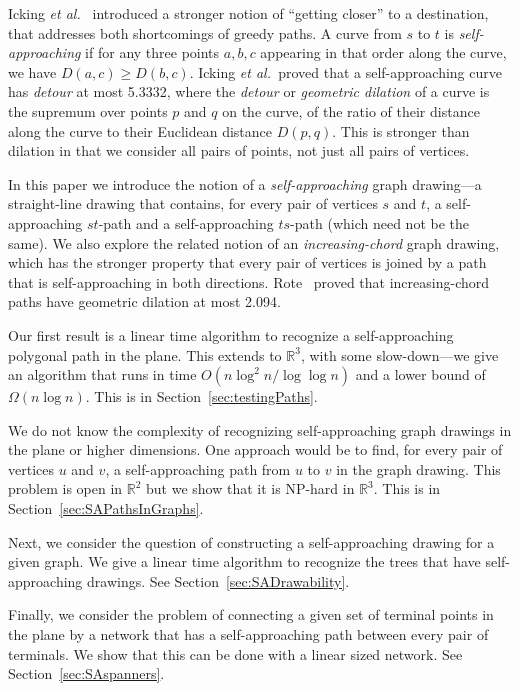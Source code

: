 \documentclass[11pt]{article}
\newcommand{\etal}{{\em et al.~}}
\begin{document}
Icking \etal\cite{Icking:self-approachingcurves:1995} introduced a stronger notion of
 ``getting closer'' to a destination, that addresses both shortcomings of greedy paths.
A curve from $s$ to $t$ is \emph{self-approaching} if for any three points $a, b, c$ appearing in that order along the curve, we have $D(a,c) \ge D(b,c)$.
Icking \etal proved that a self-approaching curve has \emph{detour} at most 5.3332, where the \emph{detour} or \emph{geometric dilation} of a curve is the supremum over points $p$ and $q$ on the curve, of the ratio of their distance along the curve to their Euclidean distance $D(p,q)$.
This is stronger than dilation in that we consider all pairs of points, not just all pairs of vertices.

In this paper we introduce the notion of a \emph{self-approaching} graph drawing---a straight-line drawing  that contains, for every pair of vertices $s$ and $t$,
a self-approaching $st$-path and a self-approaching $ts$-path (which need not be the same).
We also explore the related notion of an \emph{increasing-chord} graph drawing, which has the stronger property that every pair of vertices is joined by a path that is self-approaching in both directions.
Rote~\cite{Rote:ICcurves:1994} proved that increasing-chord paths have geometric dilation  at most 2.094.

Our first result is a linear time algorithm to recognize a self-approaching polygonal path in the plane.
This extends to $\mathbb{R}^3$, with some slow-down---we give an algorithm that runs in time $O(n \log^2 n / \log \log n)$ and a lower bound of $\Omega(n \log n)$.  This is in Section~\ref{sec:testingPaths}.

We do not know the complexity of recognizing self-approaching graph drawings in the plane or higher dimensions.
One approach would be to find, for every pair of vertices $u$ and $v$, a self-approaching path from $u$ to $v$ in the graph drawing.   This problem is open in $\mathbb{R}^2$ but we show that it  is NP-hard in $\mathbb{R}^3$.  This is in Section~\ref{sec:SAPathsInGraphs}.


Next, we consider the question of constructing a self-approaching drawing for a given graph.  We give a linear time algorithm to recognize the trees that have self-approaching drawings.  See Section~\ref{sec:SADrawability}.


Finally,  we consider the problem of connecting a given set of terminal points in the plane by a network that has a self-approaching path between every pair of terminals.  We show that this can be done with a linear sized network.  See Section~\ref{sec:SAspanners}.
\end{document}
